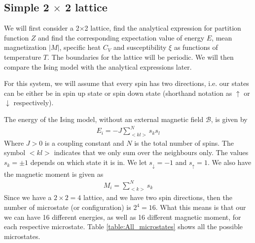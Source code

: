 \documentclass[12pt]{article}
\begin{document}
\subsection{Simple 2 $\times$ 2 lattice}
We will first consider a 2$\times$2 lattice, find the analytical expression for partition function $Z$ and find the corresponding expectation value of energy $E$, mean magnetization $|M|$, specific heat $C_V$ and susceptibility $\xi$ as functions of temperature $T$. The boundaries for the lattice will be periodic. We will then compare the Ising model with the analytical expressions later.

For this system, we will assume that every spin has two directions, i.e. our states can be either be in spin up state or spin down state (shorthand notation as $\uparrow$ or $\downarrow$ respectively).

The energy of the Ising model, without an external magnetic field $\mathcal{B}$, is given by
\begin{align*}
E_i = \displaystyle -J \sum_{<kl>}^Ns_k s_l
\end{align*} 
Where $J > 0$ is a coupling constant and $N$ is the total number of spins. The symbol $<kl>$ indicates that we only sum over the neighbours only. The values $s_k = \pm 1$ depends on which state it is in. We let $s_{\downarrow} = -1$ and $s_{\uparrow} = 1$. We also have the magnetic moment is given as
\begin{align*}
M_i = \displaystyle \sum_{<k>}^N s_k
\end{align*}
Since we have a $2\times2=4$ lattice, and we have two spin directions, then the number of microstate (or configuration) is $2^4 = 16$. What this means is that our we can have 16 different energies, as well as 16 different magnetic moment, for each respective microstate. Table \ref{table:All_microstates} shows all the possible microstates.
\end{document}
